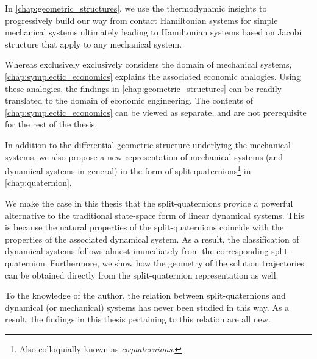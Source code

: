In \cref{chap:geometric_structures}, we use the thermodynamic insights to progressively build our way from contact Hamiltonian systems for simple mechanical systems ultimately leading to Hamiltonian systems based on Jacobi structure that apply to any mechanical system.
%

Whereas  exclusively exclusively considers the domain of mechanical systems, \cref{chap:symplectic_economics} explains the associated economic analogies. Using these analogies, the findings in \cref{chap:geometric_structures} can be readily translated to the domain of economic engineering. 
The contents of \cref{chap:symplectic_economics} can be viewed as separate, and are not prerequisite for the rest of the thesis.

In addition to the differential geometric structure underlying the mechanical systems, we also propose a new representation of mechanical systems (and dynamical systems in general) in the form of split-quaternions\footnote{Also colloquially known as \emph{coquaternions}.} in \cref{chap:quaternion}. 

We make the case in this thesis that the split-quaternions provide a powerful alternative to the traditional state-space form of linear dynamical systems. This is because the natural properties of the split-quaternions coincide with the properties of the associated dynamical system. As a result, the classification of dynamical systems follows almost immediately from the corresponding split-quaternion. Furthermore, we show how the geometry of the solution trajectories can be obtained directly from the split-quaternion representation as well.

To the knowledge of the author, the relation between split-quaternions and dynamical (or mechanical) systems has never been studied in this way. As a result, the findings in this thesis pertaining to this relation are all new.
